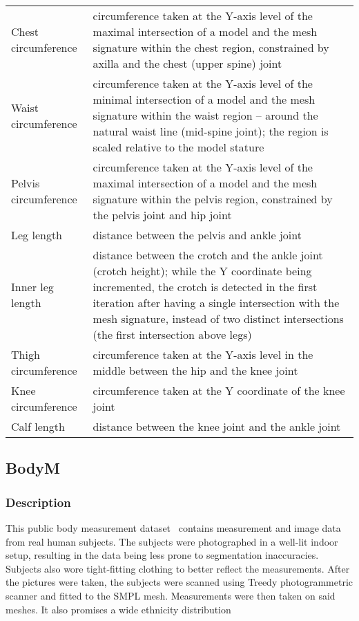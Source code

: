 \begin{table}
\begin{center}
\begin{tabularx}{\textwidth}{lX}
			Chest circumference & circumference taken at the Y-axis level of the maximal intersection of a model and the mesh signature within the chest region, constrained by axilla and the chest (upper spine) joint\\
			Waist circumference & circumference taken at the Y-axis level of the minimal intersection of a model and the mesh signature within the waist region – around the natural waist line (mid-spine joint); the region is scaled relative to the model stature\\
			Pelvis circumference & circumference taken at the Y-axis level of the maximal intersection of a model and the mesh signature within the pelvis region, constrained by the pelvis joint and hip joint\\
			Leg length & distance between the pelvis and ankle joint\\
			Inner leg length & distance between the crotch and the ankle joint (crotch height); while the Y coordinate being incremented, the crotch is detected in the first iteration after having a single intersection with the mesh signature, instead of two distinct intersections (the first intersection above legs)\\
			Thigh circumference & circumference taken at the Y-axis level in the middle between the hip and the knee joint\\
			Knee circumference & circumference taken at the Y coordinate of the knee joint\\
			Calf length & distance between the knee joint and the ankle joint\\\hline
		\end{tabularx}
	\end{center}
\end{table}

\subsection{BodyM}
\subsubsection{Description}
This public body measurement dataset~\cite{BodyM} contains measurement and image data from real human subjects. The subjects were photographed in a well-lit indoor setup, resulting in the data being less prone to segmentation inaccuracies. Subjects also wore tight-fitting clothing to better reflect the measurements. After the pictures were taken, the subjects were scanned using Treedy photogrammetric scanner and fitted to the SMPL mesh. Measurements were then taken on said meshes. It also promises a wide ethnicity distribution  
